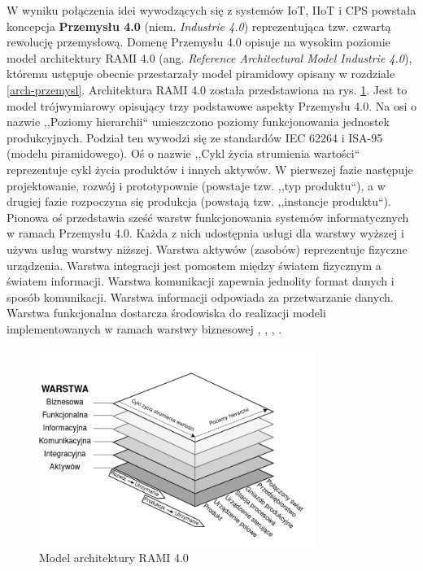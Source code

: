 \documentclass[a4paper, 12pt, twoside]{article}
\begin{document}
W wyniku połączenia idei wywodzących się z systemów IoT, IIoT i CPS
powstała koncepcja \textbf{Przemysłu 4.0} (niem. \emph{Industrie 4.0}) reprezentująca
tzw. czwartą rewolucję przemysłową. Domenę Przemysłu 4.0 opisuje na wysokim poziomie
model architektury RAMI 4.0 (ang. \emph {Reference Architectural
      Model Industrie 4.0}), któremu ustępuje
obecnie przestarzały model piramidowy opisany w rozdziale \ref{arch-przemysl}.
Architektura RAMI 4.0 została przedstawiona na rys. \ref{fig:rami}.
Jest to model trójwymiarowy opisujący trzy podstawowe aspekty Przemysłu 4.0.
Na osi o nazwie ,,Poziomy hierarchii`` umieszczono poziomy funkcjonowania
jednostek produkcyjnych. Podział ten wywodzi się ze standardów IEC 62264 i
ISA-95 (modelu piramidowego). Oś o nazwie ,,Cykl życia strumienia wartości``
reprezentuje cykl życia produktów i innych aktywów. W pierwszej fazie
następuje projektowanie, rozwój i prototypownie (powstaje tzw. ,,typ produktu``), a w
drugiej fazie rozpoczyna się produkcja (powstają tzw. ,,instancje produktu``).
Pionowa oś przedstawia sześć warstw funkcjonowania systemów informatycznych
w ramach Przemysłu 4.0. Każda z nich udostępnia usługi dla warstwy wyższej
i używa usług warstwy niższej. Warstwa aktywów (zasobów) reprezentuje fizyczne
urządzenia. Warstwa integracji jest pomostem między światem fizycznym a światem
informacji. Warstwa komunikacji zapewnia jednolity format danych i sposób komunikacji.
Warstwa informacji odpowiada za przetwarzanie danych. Warstwa funkcjonalna
dostarcza środowiska do realizacji modeli implementowanych w ramach warstwy biznesowej
\cite{iiot-challenges-opportunities-directions},
\cite{industry4-ref-models}, \cite{rami4}, \cite{iiot-cyber-manufacturing-systems}.

\begin{figure}[h]
      \centering
      \includegraphics[width=0.8\textwidth]{RAMI4.png}
      \caption{Model architektury RAMI 4.0}
      \label{fig:rami}
\end{figure}
\end{document}
